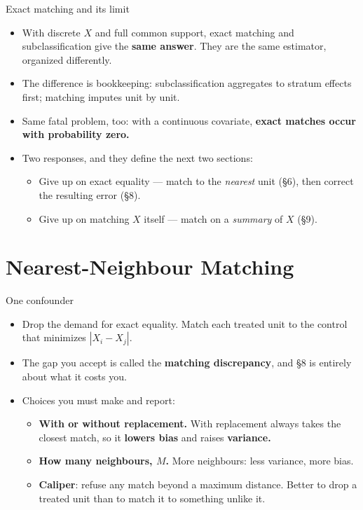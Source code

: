 \documentclass[
  11pt,
  ignorenonframetext,
  aspectratio=169,
]{beamer}
\providecommand{\tightlist}{%
  \setlength{\itemsep}{0pt}\setlength{\parskip}{0pt}}
\begin{document}
\begin{frame}{Exact matching and its limit}
\protect{}\label{exact-matching-and-its-limit}
\begin{itemize}
\tightlist
\item
  With discrete \(X\) and full common support, exact matching and
  subclassification give the \textbf{same answer}. They are the same
  estimator, organized differently.
\item
  The difference is bookkeeping: subclassification aggregates to stratum
  effects first; matching imputes unit by unit.
\item
  Same fatal problem, too: with a continuous covariate, \textbf{exact
  matches occur with probability zero.}
\item
  Two responses, and they define the next two sections:

  \begin{itemize}
  \tightlist
  \item
    Give up on exact equality --- match to the \emph{nearest} unit (§6),
    then correct the resulting error (§8).
  \item
    Give up on matching \(X\) itself --- match on a \emph{summary} of
    \(X\) (§9).
  \end{itemize}
\end{itemize}
\end{frame}

\section{Nearest-Neighbour Matching}\label{nearest-neighbour-matching}

\begin{frame}{One confounder}
\protect{}\label{one-confounder}
\begin{itemize}
\tightlist
\item
  Drop the demand for exact equality. Match each treated unit to the
  control that minimizes \(|X_i - X_j|\).
\item
  The gap you accept is called the \textbf{matching discrepancy}, and §8
  is entirely about what it costs you.
\item
  Choices you must make and report:

  \begin{itemize}
  \tightlist
  \item
    \textbf{With or without replacement.} With replacement always takes
    the closest match, so it \textbf{lowers bias} and raises
    \textbf{variance.}
  \item
    \textbf{How many neighbours, \(M\).} More neighbours: less variance,
    more bias.
  \item
    \textbf{Caliper}: refuse any match beyond a maximum distance. Better
    to drop a treated unit than to match it to something unlike it.
  \end{itemize}
\end{itemize}
\end{frame}
\end{document}
